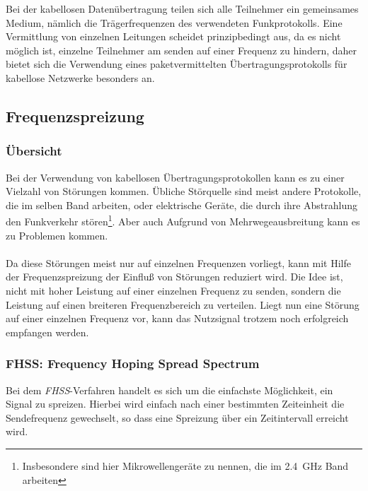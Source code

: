         Bei der kabellosen Datenübertragung teilen sich alle Teilnehmer ein gemeinsames Medium, nämlich die 
        Trägerfrequenzen des verwendeten Funkprotokolls. Eine Vermittlung von einzelnen Leitungen scheidet 
        prinzipbedingt aus, da es nicht möglich ist, einzelne Teilnehmer am senden auf einer Frequenz zu 
        hindern, daher bietet sich die Verwendung eines paketvermittelten Übertragungsprotokolls für kabellose
        Netzwerke besonders an.
        
    \subsection{Frequenzspreizung}
        \subsubsection{Übersicht}
            Bei der Verwendung von kabellosen Übertragungsprotokollen kann es zu einer Vielzahl von 
            Störungen kommen. Übliche Störquelle sind meist andere Protokolle, die im selben Band arbeiten,
            oder elektrische Geräte, die durch ihre Abstrahlung den Funkverkehr stören\footnote{Insbesondere
            sind hier Mikrowellengeräte zu nennen, die im 2.4~GHz Band arbeiten}. Aber auch Aufgrund von 
            Mehrwegeausbreitung kann es zu Problemen kommen.\\
            \\
            Da diese Störungen meist nur auf einzelnen Frequenzen vorliegt, kann mit Hilfe der 
            Frequenzspreizung der Einfluß von Störungen reduziert wird. Die Idee ist, nicht mit
            hoher Leistung auf einer einzelnen Frequenz zu senden, sondern die Leistung auf einen
            breiteren Frequenzbereich zu verteilen. Liegt nun eine Störung auf einer einzelnen
            Frequenz vor, kann das Nutzsignal trotzem noch erfolgreich empfangen werden.

        \subsubsection{FHSS: Frequency Hoping Spread Spectrum}\label{FHSS}
            Bei dem \textsl{FHSS}-Verfahren handelt es sich um die einfachste Möglichkeit, ein
            Signal zu spreizen. Hierbei wird einfach nach einer bestimmten Zeiteinheit die
            Sendefrequenz gewechselt, so dass eine Spreizung über ein Zeitintervall erreicht wird.

